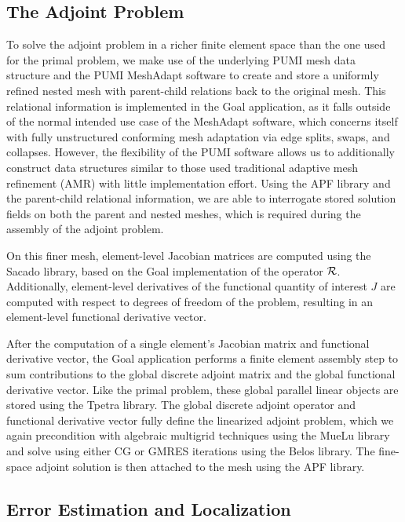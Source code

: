 \subsection{The Adjoint Problem}

To solve the adjoint problem in a richer finite element space than the one
used for the primal problem, we make use of the underlying PUMI mesh data
structure \cite{ibanez2017modifiable} and the PUMI MeshAdapt software to
create and store a uniformly refined nested mesh with parent-child relations
back to the original mesh. This relational information is implemented in the
Goal application, as it falls outside of the normal intended use case of the
MeshAdapt software, which concerns itself with fully unstructured conforming
mesh adaptation via edge splits, swaps, and collapses. However,
the flexibility of the PUMI software allows us to
additionally construct data structures similar to those used traditional
adaptive mesh refinement (AMR) with little implementation effort. Using
the APF library and the parent-child relational information, we are able
to interrogate stored solution fields on both the parent and nested meshes,
which is required during the assembly of the adjoint problem.

On this finer mesh, element-level Jacobian matrices are computed using the
Sacado library, based on the Goal implementation of the operator $\mathcal{R}$.
Additionally, element-level derivatives of the functional quantity of
interest $J$ are computed with respect to degrees of freedom of the problem,
resulting in an element-level functional derivative vector.

After the computation of a single element's Jacobian matrix and functional
derivative vector, the Goal application performs a finite element assembly
step to sum contributions to the global discrete adjoint matrix and the
global functional derivative vector. Like the primal problem, these global
parallel linear objects are stored using the Tpetra library. The global
discrete adjoint operator and functional derivative vector fully define the
linearized adjoint problem, which we again precondition with algebraic
multigrid techniques using the MueLu library and solve using either CG
or GMRES iterations using the Belos library. The fine-space adjoint solution
is then attached to the mesh using the APF library.

\subsection{Error Estimation and Localization}

